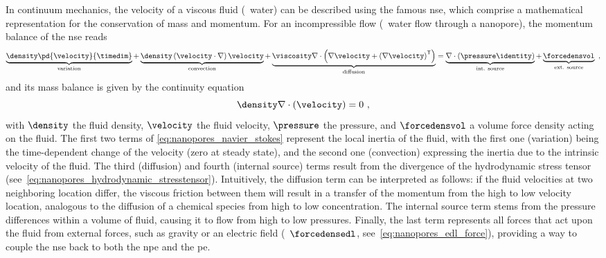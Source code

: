 In continuum mechanics, the velocity of a viscous fluid (\eg~water) can be described using the famous
\gls{nse}, which comprise a mathematical representation for the conservation of mass and momentum. For an
incompressible flow (\ie~water flow through a nanopore), the momentum balance of the \gls{nse} reads
%
\begin{equation}\label{eq:nanopores_navier_stokes}
  \underbrace{ \density \pd{\velocity}{\timedim} }_{\text{variation}}
  +
  \underbrace{ \density \left( \velocity \cdot \nabla \right) \velocity }_{\text{convection}}
  +
  \underbrace{ \viscosity \nabla \cdot \left(
    \nabla \velocity + \left(\nabla\velocity \right)^\mathsf{T} \right) }_{\text{diffusion}}
  =
  \underbrace{\nabla \cdot \left(\pressure \identity \right)}_{\text{int. source}}
  +
  \underbrace{ \forcedensvol }_{\text{ext. source}}
  \text{ ,}
\end{equation}
%
and its mass balance is given by the continuity equation
%
\begin{equation}\label{eq:nanopores_velocity_continuity}
  \density \nabla \cdot \left( \velocity \right) = 0
  \text{ ,}
\end{equation}
%
with $\density$ the fluid density, $\velocity$ the fluid velocity, $\pressure$ the pressure, and
$\forcedensvol$ a volume force density acting on the fluid. The first two terms of
\cref{eq:nanopores_navier_stokes} represent the local inertia of the fluid, with the first one (variation)
being the time-dependent change of the velocity (zero at steady state), and the second one (convection)
expressing the inertia due to the intrinsic velocity of the fluid. The third (diffusion) and fourth (internal
source) terms result from the divergence of the hydrodynamic stress tensor
(see~\cref{eq:nanopores_hydrodynamic_stresstensor}). Intuitively, the diffusion term can be interpreted as
follows: if the fluid velocities at two neighboring location differ, the viscous friction between them will
result in a transfer of the momentum from the high to low velocity location, analogous to the diffusion of a
chemical species from high to low concentration. The internal source term stems from the pressure differences
within a volume of fluid, causing it to flow from high to low pressures. Finally, the last term represents all
forces that act upon the fluid from external forces, such as gravity or an electric field
(\ie~$\forcedensedl$, see~\cref{eq:nanopores_edl_force}), providing a way to couple the \gls{nse} back to both
the \gls{npe} and the \gls{pe}.

